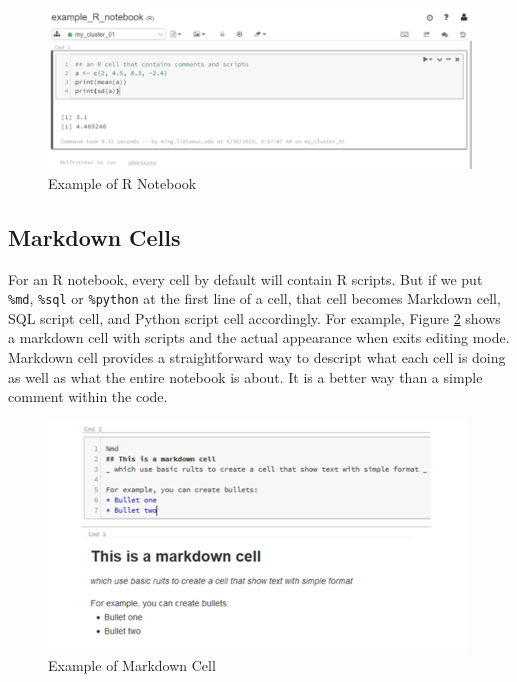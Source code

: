 \documentclass[
  12pt,
]{krantz}
\begin{document}
\begin{figure}

{\centering \includegraphics[width=1\linewidth]{images/dbxrnotebook} 

}

\caption{Example of R Notebook}\label{fig:rnotebook}
\end{figure}

\hypertarget{markdown-cells}{%
\subsection{Markdown Cells}\label{markdown-cells}}

For an R notebook, every cell by default will contain R scripts. But if we put \texttt{\%md}, \texttt{\%sql} or \texttt{\%python} at the first line of a cell, that cell becomes Markdown cell, SQL script cell, and Python script cell accordingly. For example, Figure \ref{fig:dbxmarkdown} shows a markdown cell with scripts and the actual appearance when exits editing mode. Markdown cell provides a straightforward way to descript what each cell is doing as well as what the entire notebook is about. It is a better way than a simple comment within the code.

\begin{figure}

{\centering \includegraphics[width=1\linewidth]{images/dbxmarkdown} 

}

\caption{Example of Markdown Cell}\label{fig:dbxmarkdown}
\end{figure}
\end{document}
